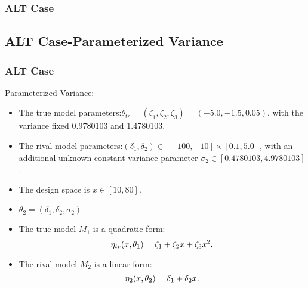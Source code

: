 \documentclass[xcolor=dvipsnames,aspectratio=1610]{beamer}
\begin{document}

\begin{frame}
\frametitle{ALT Case}

\begin{figure}
\end{figure}

\end{frame}



\subsection{ALT Case-Parameterized Variance}
\begin{frame}
\frametitle{ALT Case}
Parameterized Variance:
\begin{itemize}
\item The true model parameters:$\theta_{tr} = (\zeta_1, \zeta_2, \zeta_3) = (-5.0, -1.5, 0.05)$, with the variance fixed 0.9780103 and 1.4780103.
\item The rival model parameters:$(\delta_1, \delta_2) \in [-100, -10] \times [0.1, 5.0]$, with an additional unknown constant variance parameter $\sigma_2 \in [0.4780103, 4.9780103]$.
\item The design space is $x \in [10, 80]$.
\item $\theta_2=(\delta_1,\delta_2,\sigma_2)$

\item The true model $M_1$ is a quadratic form:
\begin{equation} \notag 
\eta_{tr}(x,\theta_1)=\zeta_1+\zeta_2x+\zeta_3x^2.
\end{equation}

\item The rival model $M_2$ is a linear form: 
\begin{equation} \notag
\eta_{2}(x,\theta_2)=\delta_1+\delta_2x.
\end{equation}
\end{itemize}

\end{frame}
\end{document}
